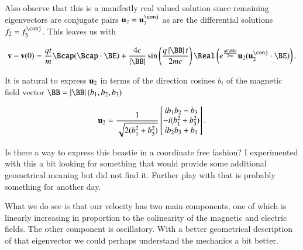Also observe that this is a manifestly real valued solution since remaining eigenvectors are conjugate pairs $\Bu_2 = \Bu_3^\conj$ as are the differential solutions $f_2 = f_3^\conj$.  This leaves us with

\begin{equation}\label{eqn:lorentzRotation:660}
\Bv - \Bv(0) = \frac{q t}{m} \Bcap (\Bcap \cdot \BE)
+ 
\frac{4 c }{\Abs{\BB}} \sin \left( \frac{q \Abs{\BB} t}{ 2 m c } \right) 
\Real \left(
e^{ \frac{q i \Abs{\BB} t}{ 2 m c } } 
\Bu_2 ( \Bu_2^\conj \cdot \BE )
\right).
\end{equation}

It is natural to express $\mathbf{u}_2$ in terms of the direction cosines $b_i$ of the magnetic field vector $\BB = \Abs{\BB}(b_1, b_2, b_3)$ 

\begin{equation}\label{eqn:lorentzRotation:680}
\mathbf{u}_2 =
\frac{1}{\sqrt{ 2(b_1^2 + b_3^2) }}
\begin{bmatrix}
i b_1 b_2 - b_3 \\
-i(b_1^2 + b_3^2) \\
i b_2 b_3 + b_1 \\
\end{bmatrix}.
\end{equation}

Is there a way to express this beastie in a coordinate free fashion?  I experimented with this a bit looking for something that would provide some additional geometrical meaning but did not find it.  Further play with that is probably something for another day.

What we do see is that our velocity has two main components, one of which is linearly increasing in proportion to the colinearity of the magnetic and electric fields.  The other component is oscillatory.  With a better geometrical description of that eigenvector we could perhaps understand the mechanics a bit better.

\EndArticle
